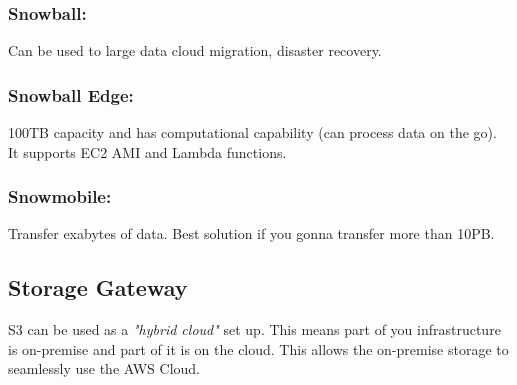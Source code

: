 \subsubsection{Snowball:} Can be used to large data cloud migration, disaster recovery.
\subsubsection{Snowball Edge:} 100TB capacity and has computational capability (can process data on the go). It supports EC2 AMI and Lambda functions.
\subsubsection{Snowmobile:} Transfer exabytes of data. Best solution if you gonna transfer more than 10PB.

\subsection{Storage Gateway}
S3 can be used as a \textit{"hybrid cloud"} set up. This means part of you infrastructure is on-premise and part of it is on the cloud.
This allows the on-premise storage to seamlessly use the AWS Cloud.
